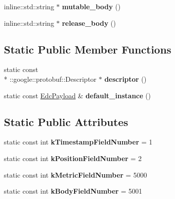 \begin{DoxyCompactItemize}
\item 
\hypertarget{classedcdatatypes_1_1_edc_payload_a988f280b384bfa78003fd749f29801b3}{inline\-::std\-::string $\ast$ {\bfseries mutable\-\_\-body} ()}\label{classedcdatatypes_1_1_edc_payload_a988f280b384bfa78003fd749f29801b3}

\item 
\hypertarget{classedcdatatypes_1_1_edc_payload_a42380789269534f37ca15d394efbc561}{inline\-::std\-::string $\ast$ {\bfseries release\-\_\-body} ()}\label{classedcdatatypes_1_1_edc_payload_a42380789269534f37ca15d394efbc561}

\end{DoxyCompactItemize}
\subsection*{Static Public Member Functions}
\begin{DoxyCompactItemize}
\item 
\hypertarget{classedcdatatypes_1_1_edc_payload_a09c1828dd3f3ffe0ddbe27c44300eb22}{static const \\*
\-::google\-::protobuf\-::\-Descriptor $\ast$ {\bfseries descriptor} ()}\label{classedcdatatypes_1_1_edc_payload_a09c1828dd3f3ffe0ddbe27c44300eb22}

\item 
\hypertarget{classedcdatatypes_1_1_edc_payload_a16efe6c06ae864d8fa2d34f6705be8c1}{static const \hyperlink{classedcdatatypes_1_1_edc_payload}{Edc\-Payload} \& {\bfseries default\-\_\-instance} ()}\label{classedcdatatypes_1_1_edc_payload_a16efe6c06ae864d8fa2d34f6705be8c1}

\end{DoxyCompactItemize}
\subsection*{Static Public Attributes}
\begin{DoxyCompactItemize}
\item 
\hypertarget{classedcdatatypes_1_1_edc_payload_a6b554af3b36b956b9868ac7f5345df33}{static const int {\bfseries k\-Timestamp\-Field\-Number} = 1}\label{classedcdatatypes_1_1_edc_payload_a6b554af3b36b956b9868ac7f5345df33}

\item 
\hypertarget{classedcdatatypes_1_1_edc_payload_a1c1c851adde94264e8d6201964aa0e81}{static const int {\bfseries k\-Position\-Field\-Number} = 2}\label{classedcdatatypes_1_1_edc_payload_a1c1c851adde94264e8d6201964aa0e81}

\item 
\hypertarget{classedcdatatypes_1_1_edc_payload_a6e11979b153e13b7023707bedc029ad1}{static const int {\bfseries k\-Metric\-Field\-Number} = 5000}\label{classedcdatatypes_1_1_edc_payload_a6e11979b153e13b7023707bedc029ad1}

\item 
\hypertarget{classedcdatatypes_1_1_edc_payload_af96f2e9c643c21167618bf43bd38cadb}{static const int {\bfseries k\-Body\-Field\-Number} = 5001}\label{classedcdatatypes_1_1_edc_payload_af96f2e9c643c21167618bf43bd38cadb}

\end{DoxyCompactItemize}
